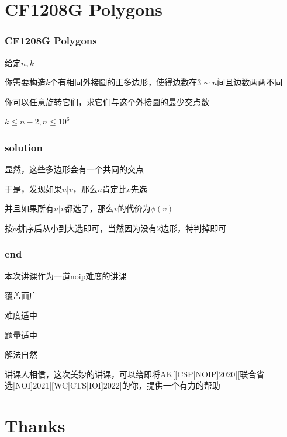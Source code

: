 \documentclass[9pt]{beamer}
\begin{document}
  \section{CF1208G Polygons}
  \begin{frame}
		\frametitle{CF1208G Polygons}
		\par 给定$n,k$
		\par 你需要构造$k$个有相同外接圆的正多边形，使得边数在$3\sim n$间且边数两两不同
		\par 你可以任意旋转它们，求它们与这个外接圆的最少交点数
		\par $k\le n-2,n\le 10^6$
	\end{frame}
	\clearpage
	\begin{frame}
		\frametitle{solution}
		 显然，这些多边形会有一个共同的交点

		 于是，发现如果$u|v$，那么$u$肯定比$v$先选

		 并且如果所有$u|v$都选了，那么$v$的代价为$\phi(v)$

		 按$\phi$排序后从小到大选即可，当然因为没有$2$边形，特判掉即可
	\end{frame}
	\clearpage
	\clearpage
	\begin{frame}
		\frametitle{end}
		 本次讲课作为一道noip难度的讲课

		 覆盖面广

		 难度适中

		 题量适中

		 解法自然

		 讲课人相信，这次美妙的讲课，可以给即将AK[[CSP|NOIP]2020|[联合省选|NOI]2021|[WC|CTS|IOI]2022]的你，提供一个有力的帮助
	\end{frame}

  \section{Thanks}
\end{document}
